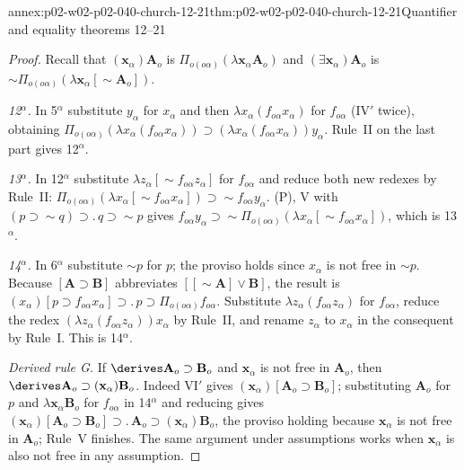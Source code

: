 \begin{annexitem}{annex:p02-w02-p02-040-church-12-21}{thm:p02-w02-p02-040-church-12-21}{Quantifier and equality theorems 12--21}
\begin{proof}
Recall that \((\mathbf x_\alpha)\mathbf A_o\) is
\(\Pi_{o(o\alpha)}(\lambda\mathbf x_\alpha\mathbf A_o)\) and
\((\exists\mathbf x_\alpha)\mathbf A_o\) is
\(\sim\Pi_{o(o\alpha)}(\lambda\mathbf x_\alpha[\sim\mathbf A_o])\).

\emph{12\(^\alpha\).}  In 5\(^\alpha\) substitute \(y_\alpha\) for
\(x_\alpha\) and then \(\lambda x_\alpha(f_{o\alpha}x_\alpha)\) for
\(f_{o\alpha}\) (IV\('\) twice), obtaining
\(\Pi_{o(o\alpha)}(\lambda x_\alpha(f_{o\alpha}x_\alpha))\supset
(\lambda x_\alpha(f_{o\alpha}x_\alpha))y_\alpha\).  Rule~II on the last part
gives 12\(^\alpha\).

\emph{13\(^\alpha\).}  In 12\(^\alpha\) substitute
\(\lambda z_\alpha[\sim f_{o\alpha}z_\alpha]\) for \(f_{o\alpha}\) and reduce
both new redexes by Rule~II:
\(\Pi_{o(o\alpha)}(\lambda x_\alpha[\sim f_{o\alpha}x_\alpha])\supset\sim f_{o\alpha}y_\alpha\).
(P), V with \((p\supset\sim q)\supset.\,q\supset\sim p\) gives
\(f_{o\alpha}y_\alpha\supset\sim\Pi_{o(o\alpha)}(\lambda x_\alpha[\sim f_{o\alpha}x_\alpha])\),
which is 13\(^\alpha\).

\emph{14\(^\alpha\).}  In 6\(^\alpha\) substitute \(\sim p\) for \(p\); the
proviso holds since \(x_\alpha\) is not free in \(\sim p\).  Because
\([\mathbf A\supset\mathbf B]\) abbreviates \([[\sim\mathbf A]\vee\mathbf B]\),
the result is
\((x_\alpha)[p\supset f_{o\alpha}x_\alpha]\supset.\,p\supset\Pi_{o(o\alpha)}f_{o\alpha}\).
Substitute \(\lambda z_\alpha(f_{o\alpha}z_\alpha)\) for \(f_{o\alpha}\), reduce
the redex \((\lambda z_\alpha(f_{o\alpha}z_\alpha))x_\alpha\) by Rule~II, and
rename \(z_\alpha\) to \(x_\alpha\) in the consequent by Rule~I.  This is
14\(^\alpha\).

\emph{Derived rule G.}  If \(\derives\mathbf A_o\supset\mathbf B_o\) and
\(\mathbf x_\alpha\) is not free in \(\mathbf A_o\), then
\(\derives\mathbf A_o\supset(\mathbf x_\alpha)\mathbf B_o\).  Indeed VI\('\)
gives \((\mathbf x_\alpha)[\mathbf A_o\supset\mathbf B_o]\); substituting
\(\mathbf A_o\) for \(p\) and \(\lambda\mathbf x_\alpha\mathbf B_o\) for
\(f_{o\alpha}\) in 14\(^\alpha\) and reducing gives
\((\mathbf x_\alpha)[\mathbf A_o\supset\mathbf B_o]\supset.\,\mathbf A_o\supset(\mathbf x_\alpha)\mathbf B_o\),
the proviso holding because \(\mathbf x_\alpha\) is not free in
\(\mathbf A_o\); Rule~V finishes.  The same argument under assumptions
works when \(\mathbf x_\alpha\) is also not free in any assumption.


\end{proof}
\end{annexitem}
